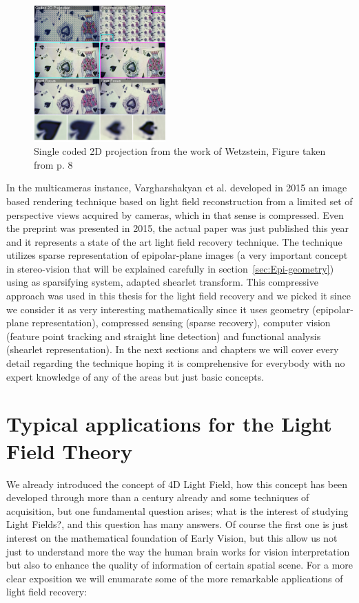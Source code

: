 \bigskip 

\begin{figure}[h!]
\centering
\includegraphics[width= 0.45\textwidth]{./Diagrams/coded-mask.jpg}
\caption{Single coded 2D projection from the work of Wetzstein, Figure taken from \cite{CompressedMIT} p. 8}
\end{figure}


In the multicameras instance, Vargharshakyan et al. \cite{LF-Shearlets} developed in 2015 an image based rendering technique based on light field reconstruction from a limited set of perspective views acquired by cameras, which in that sense is compressed. Even the preprint was presented in 2015, the actual paper was just published this year and it represents a state of the art light field recovery technique. The technique utilizes sparse representation of epipolar-plane images (a very important concept in stereo-vision that will be explained carefully in section~\ref{sec:Epi-geometry}) using as sparsifying system, adapted shearlet transform. This compressive approach was used in this thesis for the light field recovery and we picked it since we consider it as very interesting mathematically since it uses geometry (epipolar-plane representation), compressed sensing (sparse recovery), computer vision (feature point tracking and straight line detection) and functional analysis (shearlet representation). In the next sections and chapters we will cover every detail regarding the technique hoping it is comprehensive for everybody with no expert knowledge of any of the areas but just basic concepts. 


\section{Typical applications for the Light Field Theory}
\label{sec:LF-applications}

We already introduced the concept of 4D Light Field, how this concept has been developed through more than a century already and some techniques of acquisition, but one fundamental question arises; what is the interest of studying Light Fields?, and this question has many answers. Of course the first one is just interest on the mathematical foundation of Early Vision, but this allow us not just to understand more the way the human brain works for vision interpretation but also to enhance the quality of information of certain spatial scene. For a more clear exposition we will enumarate some of the more remarkable applications of light field recovery:


